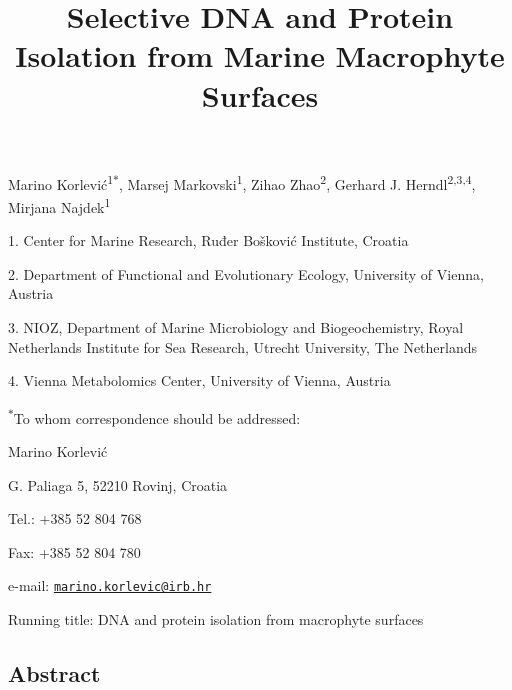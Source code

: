 \documentclass[12pt,]{article}
\title{\textbf{Selective DNA and Protein Isolation from Marine Macrophyte
Surfaces}}
\author{}
\date{}
\begin{document}
\maketitle

\vspace{20mm}

Marino Korlević\textsuperscript{1\(*\)}, Marsej
Markovski\textsuperscript{1}, Zihao Zhao\textsuperscript{2}, Gerhard J.
Herndl\textsuperscript{2,3,4}, Mirjana Najdek\textsuperscript{1}

1. Center for Marine Research, Ruđer Bošković Institute, Croatia

2. Department of Functional and Evolutionary Ecology, University of
Vienna, Austria

3. NIOZ, Department of Marine Microbiology and Biogeochemistry, Royal
Netherlands Institute for Sea Research, Utrecht University, The
Netherlands

4. Vienna Metabolomics Center, University of Vienna, Austria

\textsuperscript{\(*\)}To whom correspondence should be addressed:

Marino Korlević

G. Paliaga 5, 52210 Rovinj, Croatia

Tel.: +385 52 804 768

Fax: +385 52 804 780

e-mail:
\href{mailto:marino.korlevic@irb.hr}{\nolinkurl{marino.korlevic@irb.hr}}

Running title: DNA and protein isolation from macrophyte surfaces

\newpage
\linenumbers
{}
\setlength\parindent{24pt}
\doublespacing

\hypertarget{abstract}{%
\subsection{Abstract}\label{abstract}}
\end{document}
